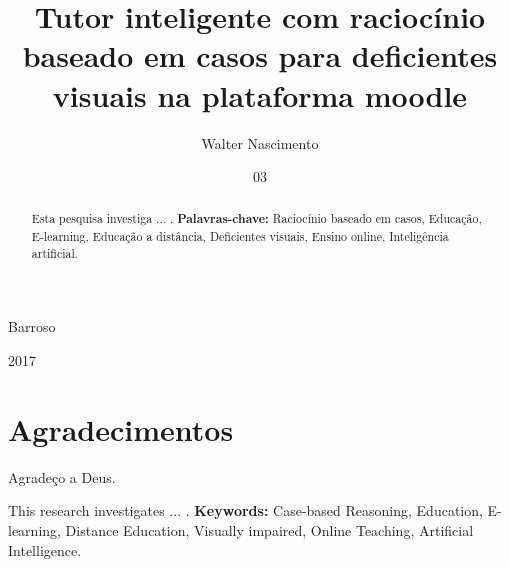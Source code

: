 \documentclass[mscexam,pdftex]{ppgi-ufam}
\begin{document}
\title{Tutor inteligente com raciocínio baseado em casos para deficientes visuais na plataforma moodle}
\author{Walter Nascimento}{Barroso}
\date{03}{2017}


\maketitle

\dedication{A Deus, \\ aos professores, \\ aos colegas de curso e \\ aos meus familiares.}

\chapter*{Agradecimentos}
Agradeço a Deus.

\begin{abstract}
Esta pesquisa investiga ... .
\linebreak
\linebreak
\textbf{Palavras-chave:} Raciocínio baseado em casos, Educação, E-learning, Educação a distância, Deficientes visuais, Ensino online, Inteligência artificial.
\end{abstract}

\begin{foreignabstract}
This research investigates ... .
\linebreak
\linebreak
\textbf{Keywords:} Case-based Reasoning, Education, E-learning, Distance Education, Visually impaired, Online Teaching, Artificial Intelligence.
\end{foreignabstract}

\setcounter{tocdepth}{1}

\tableofcontents
\listoffigures
\listoftables

\mainmatter










\label{bib:begin}

\label{bib:end}
\end{document}
